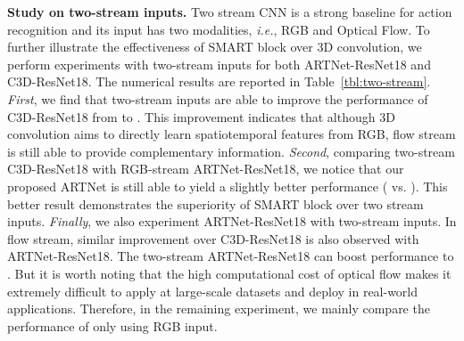 \documentclass[10pt,twocolumn,letterpaper]{article}
\begin{document}
{\bf Study on two-stream inputs.} Two stream CNN is a strong baseline for action recognition and its input has two modalities, {\em i.e.}, RGB and Optical Flow. To further illustrate the effectiveness of SMART block over 3D convolution, we perform experiments with two-stream inputs for both ARTNet-ResNet18 and C3D-ResNet18. The numerical results are reported in Table~\ref{tbl:two-stream}. {\em First}, we find that two-stream inputs are able to improve the performance of C3D-ResNet18 from  to . This improvement indicates that although 3D convolution aims to directly learn spatiotemporal features from RGB, flow stream is still able to provide complementary information. {\em Second}, comparing two-stream C3D-ResNet18 with RGB-stream ARTNet-ResNet18, we notice that our proposed ARTNet is still able to yield a slightly better performance ( vs. ). This better result demonstrates the superiority of SMART block over two stream inputs. {\em Finally}, we also experiment ARTNet-ResNet18 with two-stream inputs. In flow stream, similar improvement over C3D-ResNet18 is also observed with ARTNet-ResNet18. The two-stream ARTNet-ResNet18 can boost performance to . But it is worth noting that the high computational cost of optical flow makes it extremely difficult to apply at large-scale datasets and deploy in real-world applications. Therefore, in the remaining experiment, we mainly compare the performance of only using RGB input.

\begin{table}
\centering
{}
\vspace{1mm}
\caption{Comparison of ARTNet between without TSN and with TSN. ARTNet focuses on short-term spatiotemporal feature learning and is easily combined with the existing long-term modeling architectures. The results are reported on the validation set of Kinetics and measured by {\bf Top-1 and Top-5 accuracy}.}
\vspace{-3mm}
\label{tbl:tsn}
\end{table}
\end{document}

